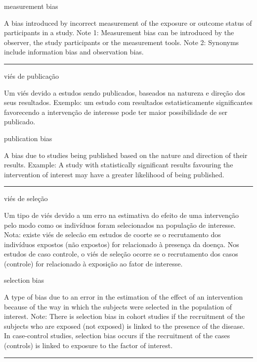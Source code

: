 \documentclass[
  openany]{book}
\begin{document}
measurement bias

A bias introduced by incorrect measurement of the exposure or outcome status of participants in a study. Note 1: Measurement bias can be introduced by the observer, the study participants or the measurement tools. Note 2: Synonyms include information bias and observation bias.

\begin{center}\rule{0.5\linewidth}{0.5pt}\end{center}

viés de publicação

Um viés devido a estudos sendo publicados, baseados na natureza e direção dos seus resultados. Exemplo: um estudo com resultados estatisticamente significantes favorecendo a intervenção de interesse pode ter maior possibilidade de ser publicado.

publication bias

A bias due to studies being published based on the nature and direction of their results. Example: A study with statistically significant results favouring the intervention of interest may have a greater likelihood of being published.

\begin{center}\rule{0.5\linewidth}{0.5pt}\end{center}

viés de seleção

Um tipo de viés devido a um erro na estimativa do efeito de uma intervenção pelo modo como os indivíduos foram selecionados na população de interesse. Nota: existe viés de selecão em estudos de coorte se o recrutamento dos indivíduos expostos (não expostos) for relacionado à presença da doença. Nos estudos de caso controle, o viés de seleção ocorre se o recrutamento dos casos (controle) for relacionado à exposição ao fator de interesse.

selection bias

A type of bias due to an error in the estimation of the effect of an intervention because of the way in which the subjects were selected in the population of interest. Note: There is selection bias in cohort studies if the recruitment of the subjects who are exposed (not exposed) is linked to the presence of the disease. In case-control studies, selection bias occurs if the recruitment of the cases (controls) is linked to exposure to the factor of interest.

\begin{center}\rule{0.5\linewidth}{0.5pt}\end{center}
\end{document}
